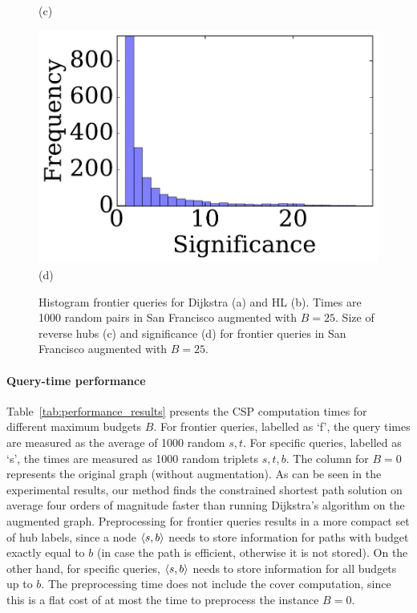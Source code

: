 \begin{figure}
{\begin{minipage}[t]{.24\textwidth}
(c)
\end{minipage}%
\begin{minipage}[t]{.24\textwidth}
\centering
\includegraphics[clip, trim = 1.3cm 0.3cm 0cm 0cm,scale=0.28]{TexImg/significance.pdf}
(d)
\end{minipage}
}
\caption{ Histogram frontier queries for Dijkstra (a) and HL (b). Times are 1000 random pairs in San Francisco augmented with $B=25$.
Size of reverse hubs (c) and significance (d) for frontier queries in San Francisco augmented with $B=25$.
}
\label{fig:SF_query}
\label{fig:SF_bwd_size}
\end{figure}

\paragraph{Query-time performance}
Table~\ref{tab:performance_results} presents the CSP computation times for different maximum budgets $B$. 
For frontier queries, labelled as `f', the query times are measured as the average of 1000 random $s,t$.
For specific queries, labelled as `s', the times are measured as 1000 random triplets $s,t,b$.
The column for $B=0$ represents the original graph (without augmentation). 
As can be seen in the experimental results, our method finds the constrained shortest path solution on average four orders of magnitude faster than running Dijkstra's algorithm on the augmented graph. 
Preprocessing for frontier queries results in a more compact set of hub labels, since a node $\langle s,b\rangle$ needs to store information for paths with budget exactly equal to $b$ (in case the path is efficient, otherwise it is not stored).
On the other hand, for specific queries, $\langle s,b\rangle$ needs to store information for all budgets up to $b$.
The preprocessing time does not include the cover computation, since this is a flat cost of at most the time to preprocess the instance $B=0$.

